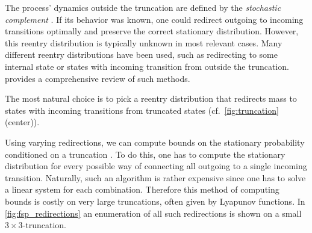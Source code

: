 The process' dynamics outside the truncation are defined by the
\emph{stochastic complement} \parencite{spieler2014numerical}.
If its behavior was known, one could redirect outgoing to incoming
transitions optimally and preserve the correct stationary distribution.
However, this reentry distribution is typically unknown in most relevant cases.
Many different reentry distributions have been used, such as
redirecting to some internal state or states with incoming transition
from outside the truncation.
\citet{kuntz2021approximations} provides a comprehensive review of such methods.

The most natural choice is to pick a reentry distribution that
redirects mass to states with incoming transitions from truncated
states (cf.\ \autoref{fig:truncation} (center)).

Using varying redirections, we can compute bounds on the stationary
probability conditioned on a truncation
\parencite[Thm.~14]{spieler2014numerical}.
To do this, one has to compute the stationary distribution for every
possible way of connecting all outgoing to a single incoming transition.
Naturally, such an algorithm is rather expensive since one has to
solve a linear system for each combination.
Therefore this method of computing bounds is costly on very large
truncations, often given by Lyapunov functions.
In \autoref{fig:fsp_redirections} an enumeration of all such
redirections is shown on a small $3\times 3$-truncation.
